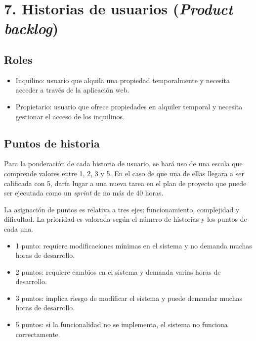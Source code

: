 \documentclass[
11pt, %
codirector, %
]{charter}
\begin{document}
\section{7. Historias de usuarios (\textit{Product backlog})}
\label{sec:backlog}

\subsection{Roles}
\begin{itemize}
\item Inquilino: usuario que alquila una propiedad temporalmente y necesita acceder a través de la aplicación web.
\item Propietario: usuario que ofrece propiedades en alquiler temporal y necesita gestionar el acceso de los inquilinos.
\end{itemize}

\subsection{Puntos de historia}
Para la ponderación de cada historia de usuario, se hará uso de una escala que comprende valores entre 1, 2, 3 y 5. En el caso de que una de ellas llegara a ser calificada con 5, daría lugar a una nueva tarea en el plan de proyecto que puede ser ejecutada como un \textit{sprint} de no más de 40 horas.

La asignación de puntos es relativa a tres ejes: funcionamiento, complejidad y dificultad. La prioridad es valorada según el número de historias y los puntos de cada una.

\begin{itemize}
\item 1 punto: requiere modificaciones mínimas en el sistema y no demanda muchas horas de desarrollo.
\item 2 puntos: requiere cambios en el sistema y demanda varias horas de desarrollo.
\item 3 puntos: implica riesgo de modificar el sistema y puede demandar muchas horas de desarrollo.
\item 5 puntos: si la funcionalidad no se implementa, el sistema no funciona correctamente.
\end{itemize}
\end{document}
